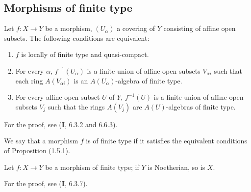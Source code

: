 \subsection{Morphisms of finite type}
\label{subsection:IV.1.5}

\begin{proposition}[1.5.1]
\label{IV.1.5.1}
Let $f:X\to Y$ be a morphism, $(U_\alpha)$ a covering of $Y$ consisting of
affine open subsets. The following conditions are equivalent:
\begin{enumerate}
  \item[\textup{a)}] $f$ is locally of finite type and quasi-compact.
  \item[\textup{b)}] For every $\alpha$, $f^{-1}(U_\alpha)$ is a finite union of
  affine open subsets $V_{\alpha i}$ such that each ring $A(V_{\alpha i})$ is
  an $A(U_\alpha)$-algebra of finite type.
  \item[\textup{c)}] For every affine open subset $U$ of $Y$, $f^{-1}(U)$ is a finite
  union of affine open subsets $V_j$ such that the rings $A(V_j)$ are
  $A(U)$-algebras of finite type.
\end{enumerate}
\end{proposition}

For the proof, see (\textbf{I}, 6.3.2 and 6.6.3).

\begin{definition}[1.5.2]
\label{IV.1.5.2}
We say that a morphism $f$ is of finite type if it satisfies the
equivalent conditions of Proposition \textup{(1.5.1)}.
\end{definition}


\begin{proposition}[1.5.3]
\label{IV.1.5.3}
Let $f:X\to Y$ be a morphism of finite type; if $Y$ is Noetherian, so is
$X$.
\end{proposition}

For the proof, see (\textbf{I}, 6.3.7).

